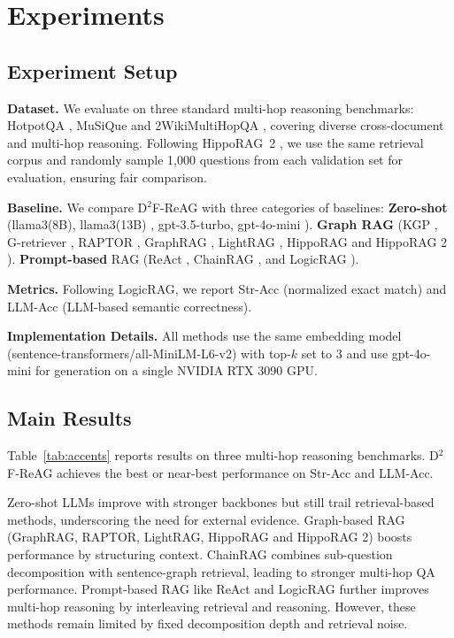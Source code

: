 \documentclass[11pt]{article}
\begin{document}
\section{Experiments}
\subsection{Experiment Setup}
\textbf{Dataset.}
We evaluate on three standard multi-hop reasoning benchmarks: HotpotQA \cite{yang-etal-2018-hotpotqa}, MuSiQue \cite{trivedi2021musique} and 2WikiMultiHopQA \cite{ho-etal-2020-constructing}, covering diverse cross-document and multi-hop reasoning. Following HippoRAG~2 \cite{gutiérrez2025ragmemorynonparametriccontinual}, we use the same retrieval corpus and randomly sample 1,000 questions from each validation set for evaluation, ensuring fair comparison.

\textbf{Baseline.}
We compare D$^2$F-ReAG with three categories of baselines: \textbf{Zero-shot} (llama3(8B), llama3(13B) \cite{dubey2024llama}, gpt-3.5-turbo, gpt-4o-mini \cite{achiam2023gpt}). \textbf{Graph RAG} (KGP \cite{wang2024knowledge}, G-retriever \cite{he2024g}, RAPTOR \cite{sarthi2024raptor}, GraphRAG \cite{edge2024local}, LightRAG \cite{guo-etal-2025-lightrag}, HippoRAG \cite{gutiérrez2024hipporag} and HippoRAG 2 \cite{gutiérrez2025ragmemorynonparametriccontinual}). \textbf{Prompt-based} RAG (ReAct \cite{yao2023react}, ChainRAG \cite{zhu-etal-2025-mitigating}, and LogicRAG \cite{chen2025you}).

\textbf{Metrics.} Following LogicRAG, we report Str-Acc (normalized exact match) and LLM-Acc (LLM-based semantic correctness).


\textbf{Implementation Details.} All methods use the same embedding model (sentence-transformers/all-MiniLM-L6-v2) \cite{wang-etal-2021-minilmv2} with top-$k$ set to 3 and use gpt-4o-mini \cite{achiam2023gpt} for generation on a single NVIDIA RTX 3090 GPU.



\subsection{Main Results}
Table~\ref{tab:accents} reports results on three multi-hop reasoning benchmarks. D$^2$F-ReAG achieves the best or near-best performance on Str-Acc and LLM-Acc.

Zero-shot LLMs improve with stronger backbones but still trail retrieval-based methods, underscoring the need for external evidence. Graph-based RAG (GraphRAG, RAPTOR, LightRAG, HippoRAG and HippoRAG 2) boosts performance by structuring context. ChainRAG combines sub-question decomposition with sentence-graph retrieval, leading to stronger multi-hop QA performance. Prompt-based RAG like ReAct and LogicRAG further improves multi-hop reasoning by interleaving retrieval and reasoning. However, these methods remain limited by fixed decomposition depth and retrieval noise.
\end{document}
